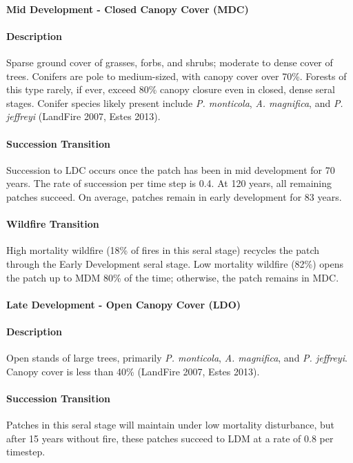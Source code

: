 \noindent\hrulefill

\paragraph{Mid Development - Closed Canopy Cover (MDC)}

\paragraph{Description} Sparse ground cover of grasses, forbs, and shrubs; moderate to dense cover of trees. Conifers are pole to medium-sized, with canopy cover over 70\%. Forests of this type rarely, if ever, exceed 80\% canopy closure even in closed, dense seral stages. Conifer species likely present include \emph{P. monticola}, \emph{A. magnifica}, and \emph{P. jeffreyi} (LandFire 2007, Estes 2013).

\paragraph{Succession Transition} Succession to LDC occurs once the patch has been in mid development for 70 years. The rate of succession per time step is 0.4. At 120 years, all remaining patches succeed. On average, patches remain in early development for 83 years.

\paragraph{Wildfire Transition} High mortality wildfire (18\% of fires in this seral stage) recycles the patch through the Early Development seral stage. Low mortality wildfire (82\%) opens the patch up to MDM 80\% of the time; otherwise, the patch remains in MDC.

\noindent\hrulefill


\paragraph{Late Development - Open Canopy Cover (LDO)}

\paragraph{Description} Open stands of large trees, primarily \emph{P. monticola}, \emph{A. magnifica}, and \emph{P. jeffreyi}. Canopy cover is less than 40\% (LandFire 2007, Estes 2013).

\paragraph{Succession Transition} Patches in this seral stage will maintain under low mortality disturbance, but after 15 years without fire, these patches succeed to LDM at a rate of 0.8 per timestep.


